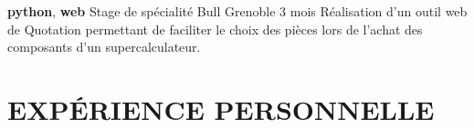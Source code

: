 \documentclass[11pt,a4paper]{moderncv}
\begin{document}


  \cventry
    {\textbf{python}, \textbf{web}}
    {Stage de spécialité}
    {Bull}
    {Grenoble}
    {3 mois}{
      Réalisation d'un outil web de Quotation permettant de faciliter le choix
      des pièces lors de l'achat des composants d'un supercalculateur.
    }





  \section{EXPÉRIENCE PERSONNELLE}
\end{document}
